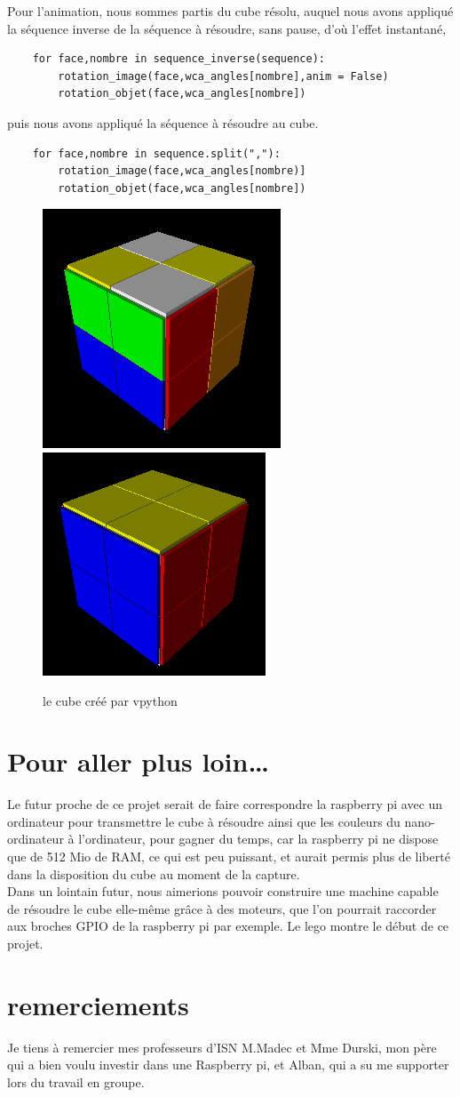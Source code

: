 \documentclass[11pt,a4paper]{article}
\begin{document}
Pour l'animation, nous sommes partis du cube résolu, auquel nous avons appliqué la séquence inverse de la
séquence à résoudre, sans pause, d'où l'effet instantané, 
\begin{lstlisting}
    for face,nombre in sequence_inverse(sequence):
        rotation_image(face,wca_angles[nombre],anim = False)
        rotation_objet(face,wca_angles[nombre])
\end{lstlisting}
puis nous avons appliqué la séquence à résoudre au cube.
\begin{lstlisting}
    for face,nombre in sequence.split(","):
        rotation_image(face,wca_angles[nombre)]
        rotation_objet(face,wca_angles[nombre])
\end{lstlisting}

\begin{figure}[h]
	\centering
	\includegraphics[scale=0.5]{capturevpython}
	\qquad
	\includegraphics[scale=0.533]{captureresolu}
	\caption{le cube créé par vpython}
\end{figure}


\section*{Pour aller plus loin…}
Le futur proche de ce projet serait de faire correspondre la raspberry pi avec un ordinateur pour transmettre
le cube à résoudre ainsi que les couleurs du nano-ordinateur à l'ordinateur, pour gagner du temps, car la
raspberry pi ne dispose que de 512 Mio de RAM, ce qui est peu puissant, et aurait permis plus de liberté
dans la disposition du cube au moment de la capture.\\
Dans un lointain futur, nous aimerions pouvoir construire une machine capable de résoudre le cube elle-même
grâce à des moteurs, que l'on pourrait raccorder aux broches GPIO de la raspberry pi par exemple. Le lego
montre le début de ce projet.

\section*{remerciements}
Je tiens à remercier mes professeurs d'ISN M.Madec et Mme Durski, mon père qui a bien voulu investir dans une Raspberry pi, et Alban, qui a su me supporter lors du travail en groupe.
\end{document}
